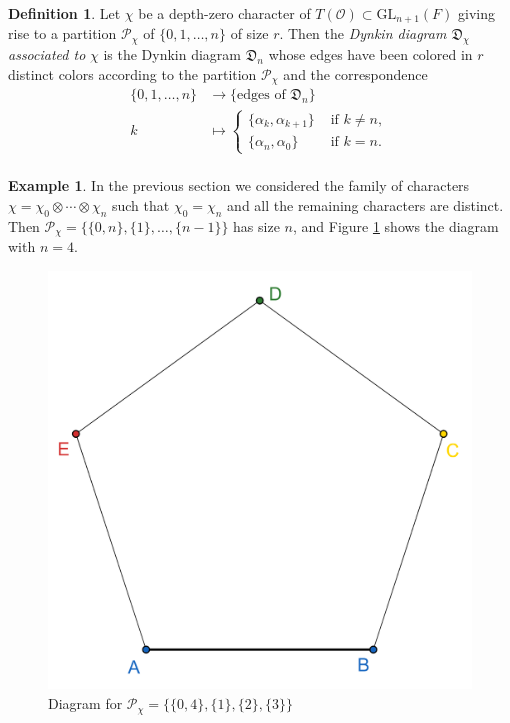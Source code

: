 \documentclass{article}
\newcommand{\GL}{\mathrm{GL}}
\newcommand{\cO}{\mathcal{O}}
\theoremstyle{plain}
\theoremstyle{definition}
\newtheorem{definition}[theorem]{Definition}
\newtheorem{example}[theorem]{Example}
\begin{document}
    \begin{definition}
        Let $\chi$ be a depth-zero character of $T(\cO)\subset\GL_{n+1}(F)$ giving rise to a partition $\mathcal{P}_\chi$ of $\{0,1,\ldots,n\}$ of size $r$. Then the \textit{Dynkin diagram $\mathfrak{D}_\chi$ associated to} $\chi$ is the Dynkin diagram $\mathfrak{D}_n$ whose edges have been colored in $r$ distinct colors according to the partition $\mathcal{P}_\chi$ and the correspondence 
        \begin{align*}
            \{0,1,\ldots,n\}&\longrightarrow\{\text{edges of }\mathfrak{D}_n\}\\
            k&\longmapsto
            \begin{cases}
                \{\alpha_k,\alpha_{k+1}\} &\text{ if }k\neq n,\\
                \{\alpha_n,\alpha_0\} &\text{ if }k=n.
            \end{cases}\\
        \end{align*}
    \end{definition}

    \newpage
    \begin{example}
        In the previous section we considered the family of characters $\chi=\chi_0\otimes\cdots\otimes\chi_n$ such that $\chi_0=\chi_n$ and all the remaining characters are distinct. Then $\mathcal{P}_\chi=\{\{0,n\},\{1\},\ldots,\{n-1\}\}$ has size $n$, and Figure \ref{fig_diagn4} shows the diagram with $n=4$.
        \begin{figure}[h]
            \begin{center}
                \includegraphics[scale=0.8]{geogebra-export.png}
                \caption{Diagram for $\mathcal{P}_\chi=\{\{0,4\},\{1\},\{2\},\{3\}\}$}
                \label{fig_diagn4}
            \end{center}
        \end{figure}
    \end{example}
\end{document}
